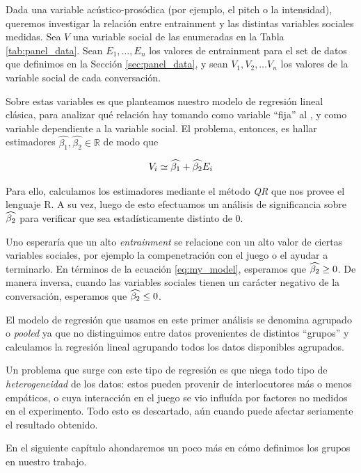 Dada una variable acústico-prosódica (por ejemplo, el pitch o la intensidad), queremos investigar la relación entre entrainment y las distintas variables sociales medidas. Sea $V$ una variable social de las enumeradas en la Tabla \ref{tab:panel_data}. Sean $E_1, \ldots, E_n$ los valores de entrainment para el set de datos que definimos en la Sección \ref{sec:panel_data}, y sean $V_1, V_2, \ldots V_n$ los valores de la variable social de cada conversación.

Sobre estas variables es que planteamos nuestro modelo de regresión lineal clásica, para analizar qué relación hay tomando como variable ``fija'' al \entrainment, y como variable dependiente a la variable social. El problema, entonces, es hallar estimadores $\widehat{\beta_1}, \widehat{\beta_2} \in \mathbb{R}$ de modo que

\begin{equation}
  V_i \simeq \widehat{\beta_1} + \widehat{\beta_2} E_i
  \label{eq:my_model}
\end{equation}


Para ello, calculamos los estimadores mediante el método \emph{QR} que nos provee el lenguaje R. A su vez, luego de esto efectuamos un análisis de significancia sobre $\widehat{\beta_2}$ para verificar que sea estadísticamente distinto de 0.

Uno esperaría que un alto \emph{entrainment} se relacione con un alto valor de ciertas variables sociales, por ejemplo la compenetración con el juego o el ayudar a terminarlo. En términos de la ecuación \ref{eq:my_model}, esperamos que $\widehat{\beta_2} \geq 0$. De manera inversa, cuando las variables sociales tienen un carácter negativo de la conversación, esperamos que $\widehat{\beta_2} \leq 0$.


El modelo de regresión que usamos en este primer análisis se denomina agrupado o \emph{pooled} ya que no distinguimos entre datos provenientes de distintos ``grupos'' \cite{gujarati1999} y calculamos la regresión lineal agrupando todos los datos disponibles agrupados.

Un problema que surge con este tipo de regresión es que niega todo tipo de \emph{heterogeneidad} de los datos: estos pueden provenir de interlocutores más o menos empáticos, o cuya interacción en el juego se vio influída por factores no medidos en el experimento. Todo esto es descartado, aún cuando puede afectar seriamente  el resultado obtenido.

En el siguiente capítulo ahondaremos un poco más en cómo definimos los grupos en nuestro trabajo.

